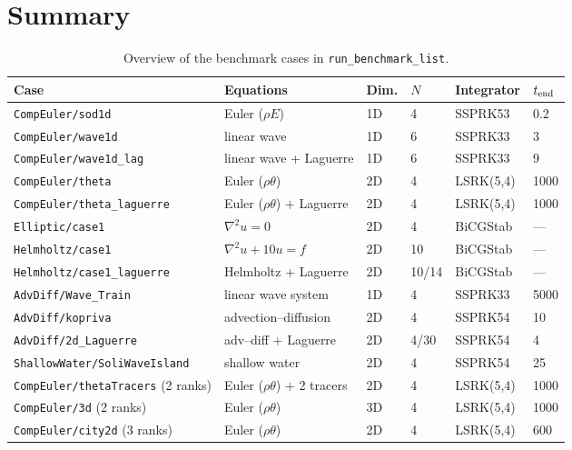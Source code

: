 \documentclass[11pt,a4paper]{article}
\begin{document}
\section{Summary}
\begin{table}[htb!]
\centering
\small
\caption{Overview of the benchmark cases in
\texttt{run\_benchmark\_list}.}
\label{tab:summary}
\begin{tabular}{llllll}
\toprule
Case & Equations & Dim. & $N$ & Integrator & $t_{\rm end}$ \\
\midrule
\texttt{CompEuler/sod1d}          & Euler ($\rho E$)        & 1D & 4  & SSPRK53 & 0.2 \\
\texttt{CompEuler/wave1d}         & linear wave             & 1D & 6  & SSPRK33 & 3 \\
\texttt{CompEuler/wave1d\_lag}    & linear wave + Laguerre  & 1D & 6  & SSPRK33 & 9 \\
\texttt{CompEuler/theta}          & Euler ($\rho\theta$)    & 2D & 4  & LSRK(5,4) & 1000 \\
\texttt{CompEuler/theta\_laguerre}& Euler ($\rho\theta$) + Laguerre & 2D & 4 & LSRK(5,4) & 1000 \\
\texttt{Elliptic/case1}           & $\nabla^2 u = 0$        & 2D & 4  & BiCGStab & --- \\
\texttt{Helmholtz/case1}          & $\nabla^2 u + 10u = f$  & 2D & 10 & BiCGStab & --- \\
\texttt{Helmholtz/case1\_laguerre}& Helmholtz + Laguerre    & 2D & 10/14 & BiCGStab & --- \\
\texttt{AdvDiff/Wave\_Train}      & linear wave system      & 1D & 4  & SSPRK33 & 5000 \\
\texttt{AdvDiff/kopriva}          & advection--diffusion    & 2D & 4  & SSPRK54 & 10 \\
\texttt{AdvDiff/2d\_Laguerre}     & adv--diff + Laguerre    & 2D & 4/30 & SSPRK54 & 4 \\
\texttt{ShallowWater/SoliWaveIsland} & shallow water        & 2D & 4  & SSPRK54 & 25 \\
\midrule
\texttt{CompEuler/thetaTracers} (2 ranks) & Euler ($\rho\theta$) + 2 tracers & 2D & 4 & LSRK(5,4) & 1000 \\
\texttt{CompEuler/3d} (2 ranks)           & Euler ($\rho\theta$)             & 3D & 4 & LSRK(5,4) & 1000 \\
\texttt{CompEuler/city2d} (3 ranks)       & Euler ($\rho\theta$)             & 2D & 4 & LSRK(5,4) & 600 \\
\bottomrule
\end{tabular}
\end{table}
\end{document}
